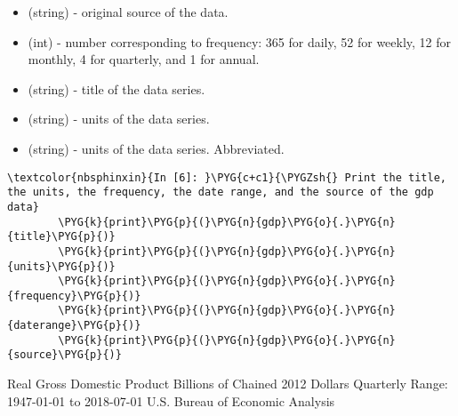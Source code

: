 \documentclass[letterpaper,10pt,openany,oneside,english]{sphinxmanual}
\begin{document}
\begin{itemize}
\item {} 
 (string) - original source of the data.

\item {} 
 (int) - number corresponding to frequency: 365 for daily, 52 for weekly, 12 for monthly, 4 for quarterly, and 1 for annual.

\item {} 
 (string) - title of the data series.

\item {} 
 (string) - units of the data series.

\item {} 
 (string) - units of the data series. Abbreviated.

\end{itemize}

%
\begin{Verbatim}[commandchars=\\\{\}]
\textcolor{nbsphinxin}{In [6]: }\PYG{c+c1}{\PYGZsh{} Print the title, the units, the frequency, the date range, and the source of the gdp data}
        \PYG{k}{print}\PYG{p}{(}\PYG{n}{gdp}\PYG{o}{.}\PYG{n}{title}\PYG{p}{)}
        \PYG{k}{print}\PYG{p}{(}\PYG{n}{gdp}\PYG{o}{.}\PYG{n}{units}\PYG{p}{)}
        \PYG{k}{print}\PYG{p}{(}\PYG{n}{gdp}\PYG{o}{.}\PYG{n}{frequency}\PYG{p}{)}
        \PYG{k}{print}\PYG{p}{(}\PYG{n}{gdp}\PYG{o}{.}\PYG{n}{daterange}\PYG{p}{)}
        \PYG{k}{print}\PYG{p}{(}\PYG{n}{gdp}\PYG{o}{.}\PYG{n}{source}\PYG{p}{)}
\end{Verbatim}



%
\begin{OriginalVerbatim}[commandchars=\\\{\}]
Real Gross Domestic Product
Billions of Chained 2012 Dollars
Quarterly
Range: 1947-01-01 to 2018-07-01
U.S. Bureau of Economic Analysis
\end{OriginalVerbatim}
\relax
\end{document}
